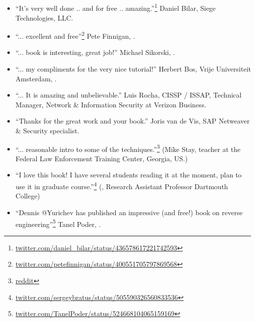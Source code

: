 \subsection*{ \IT{\TITLE}}

\begin{itemize}
\item ``It's very well done .. and for free .. amazing.''\footnote{\href{http://go.yurichev.com/17095}{twitter.com/daniel\_bilar/status/436578617221742593}} Daniel Bilar, Siege Technologies, LLC.

\item ``... excellent and free''\footnote{\href{http://go.yurichev.com/17096}{twitter.com/petefinnigan/status/400551705797869568}} Pete Finnigan, \oracle{}.

\item ``... book is interesting, great job!'' Michael Sikorski,  .

\item ``... my compliments for the very nice tutorial!'' Herbert Bos,  Vrije Universiteit Amsterdam,  .

\item ``... It is amazing and unbelievable.'' Luis Rocha, CISSP / ISSAP, Technical Manager, Network \& Information Security at Verizon Business.

\item ``Thanks for the great work and your book.'' Joris van de Vis, SAP Netweaver \& Security specialist.

\item ``... reasonable intro to some of the techniques.''\footnote{\href{http://go.yurichev.com/17099}{reddit}} (Mike Stay, teacher at the Federal Law Enforcement Training Center, Georgia, US.)

\item ``I love this book! I have several students reading it at the moment, plan to use it in graduate course.''\footnote{\href{http://go.yurichev.com/17097}{twitter.com/sergeybratus/status/505590326560833536}} (, Research Assistant Professor   Dartmouth College)

\item ``Dennis @Yurichev has published an impressive (and free!) book on reverse engineering''\footnote{\href{http://go.yurichev.com/17098}{twitter.com/TanelPoder/status/524668104065159169}} Tanel Poder, .

\end{itemize}